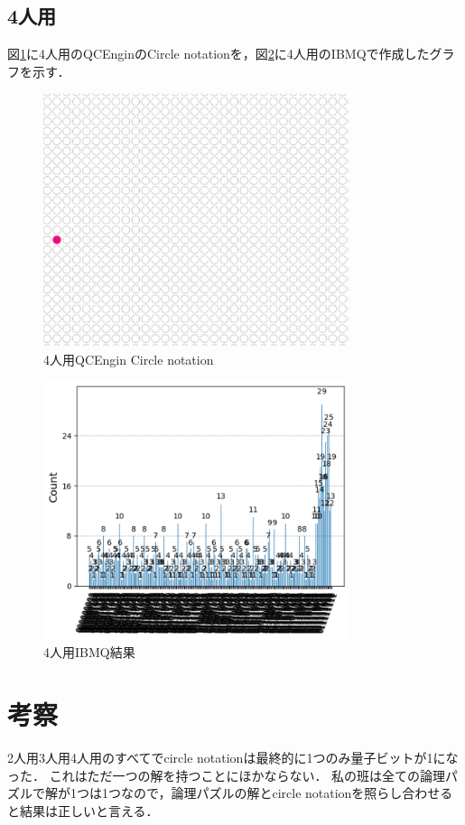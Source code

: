 \documentclass[titlepage,a4paper]{jsarticle}
\begin{document}
\subsection{4人用}
図\ref{4:circle}に4人用のQCEnginのCircle notationを，図\ref{4:ibmq}に4人用のIBMQで作成したグラフを示す．
\begin{figure}[H]
  \centering
  \includegraphics[width=0.8\textwidth]{img/4_circle.png}
  \caption{4人用QCEngin Circle notation}
  \label{4:circle}
\end{figure}
\begin{figure}[H]
  \centering
  \includegraphics[width=0.8\textwidth]{img/4_kairyoou_python.png}
  \caption{4人用IBMQ結果}
  \label{4:ibmq}
\end{figure}
\section{考察}
2人用3人用4人用のすべてでcircle notationは最終的に1つのみ量子ビットが1になった．
これはただ一つの解を持つことにほかならない．
私の班は全ての論理パズルで解が1つは1つなので，論理パズルの解とcircle notationを照らし合わせると結果は正しいと言える．
\end{document}

